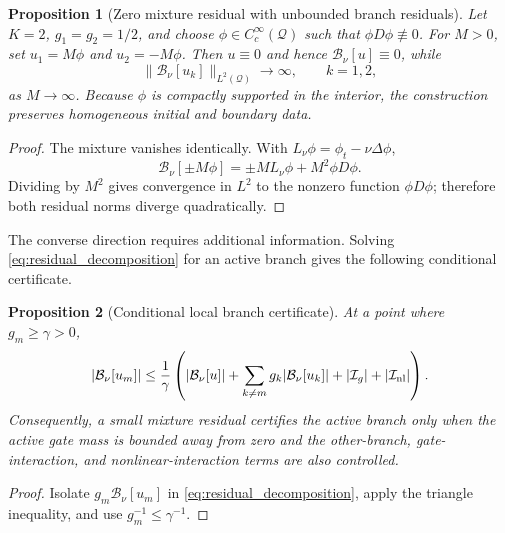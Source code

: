 \documentclass[preprint,12pt]{elsarticle}
\newtheorem{proposition}{Proposition}
\theoremstyle{remark}
\begin{document}
\begin{proposition}[Zero mixture residual with unbounded branch residuals]
\label{prop:residual_counterexample}
Let $K=2$, $g_1=g_2=1/2$, and choose
$\phi\in C_c^\infty(\mathcal Q)$ such that $\phi D\phi\not\equiv0$. For
$M>0$, set $u_1=M\phi$ and $u_2=-M\phi$. Then $u\equiv0$ and hence
$\mathcal B_\nu[u]\equiv0$, while
\begin{equation}
\|\mathcal B_\nu[u_k]\|_{L^2(\mathcal Q)}\longrightarrow\infty,
\qquad k=1,2,
\end{equation}
as $M\to\infty$. Because $\phi$ is compactly supported in the interior,
the construction preserves homogeneous initial and boundary data.
\end{proposition}
\begin{proof}
The mixture vanishes identically. With
$L_\nu\phi=\phi_t-\nu\Delta\phi$,
\begin{equation}
\mathcal B_\nu[\pm M\phi]
=\pm M L_\nu\phi+M^2\phi D\phi.
\end{equation}
Dividing by $M^2$ gives convergence in $L^2$ to the nonzero function
$\phi D\phi$; therefore both residual norms diverge quadratically.
\end{proof}

The converse direction requires additional information. Solving
\eqref{eq:residual_decomposition} for an active branch gives the following
conditional certificate.

\begin{proposition}[Conditional local branch certificate]
\label{prop:conditional_certificate}
At a point where $g_m\ge\gamma>0$,
\begin{equation}
|\mathcal B_\nu[u_m]|
\le \frac{1}{\gamma}\left(
|\mathcal B_\nu[u]|+
\sum_{k\ne m}g_k|\mathcal B_\nu[u_k]|+
|\mathcal I_g|+|\mathcal I_{\rm nl}|
\right).
\label{eq:branch_certificate}
\end{equation}
Consequently, a small mixture residual certifies the active branch only when
the active gate mass is bounded away from zero and the other-branch,
gate-interaction, and nonlinear-interaction terms are also controlled.
\end{proposition}
\begin{proof}
Isolate $g_m\mathcal B_\nu[u_m]$ in
\eqref{eq:residual_decomposition}, apply the triangle inequality, and use
$g_m^{-1}\le\gamma^{-1}$.
\end{proof}
\end{document}
